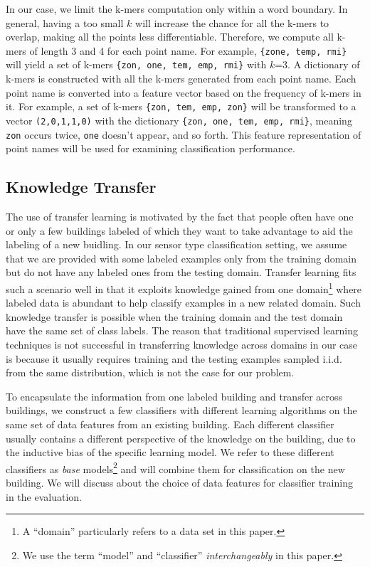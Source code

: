 In our case, we limit the k-mers computation only within a word boundary.
In general, having a too small $k$ will increase the chance for all the k-mers to overlap, making all the points less differentiable.
Therefore, we compute all k-mers of length 3 and 4 for each point name.
For example, \texttt{\{zone, temp, rmi\}} will yield a set of k-mers \texttt{\{zon, one, tem, emp, rmi\}} with $k$=3.
A dictionary of k-mers is constructed with all the k-mers generated from each point name. 
Each point name is converted into a feature vector based on the frequency of k-mers in it. 
For example, a set of k-mers \texttt{\{zon, tem, emp, zon\}} will be transformed to a vector
\texttt{(2,0,1,1,0)} with the dictionary \texttt{\{zon, one, tem, emp, rmi\}}, meaning \texttt{zon} occurs twice, \texttt{one} doesn't appear, and so forth. 
This feature representation of point names will be used for examining classification performance.


\subsection{Knowledge Transfer}
The use of transfer learning is motivated by the fact that people often have one or only a few buildings labeled of which they want to take advantage to aid the labeling of a new buidling.
In our sensor type classification setting, we assume that we are provided with some labeled examples only from the training domain but do not have any labeled ones from the testing domain. 
Transfer learning fits such a scenario well in that it exploits knowledge gained from one domain\footnote{A ``domain'' particularly refers to a data set  in this paper.} where labeled data is abundant to help classify examples in a new related domain. 
Such knowledge transfer is possible when the training domain and the test domain have the same set of class labels. 
The reason that traditional supervised learning techniques is not successful in transferring knowledge across domains in our case is because it usually requires training and the testing examples sampled i.i.d. from the same distribution, which is not the case for our problem.

To encapsulate the information from one labeled building and transfer across buildings, we construct a few classifiers with different learning algorithms on the same set of data features from an existing building. 
Each different classifier usually contains a different perspective of the knowledge on the building, due to the inductive bias of the specific learning model. 
We refer to these different classifiers as {\it base} models\footnote{We use the term ``model'' and ``classifier'' {\it interchangeably} in this paper.} and will combine them for classification on the new building.
We will discuss about the choice of data features for classifier training in the evaluation.


